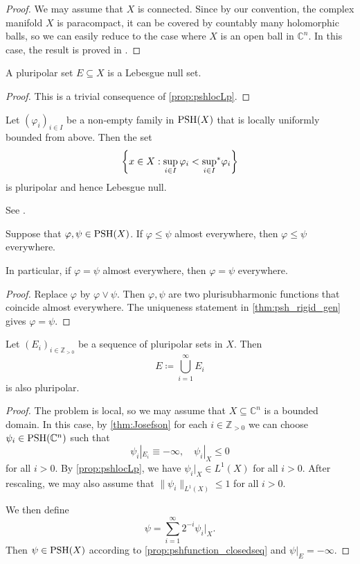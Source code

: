 \begin{proof}
    We may assume that $X$ is connected. Since by our convention, the complex manifold $X$ is paracompact, it can be covered by countably many holomorphic balls, so we can easily reduce to the case where $X$ is an open ball in $\mathbb{C}^n$. In this case, the result is proved in \cite[Lemma~4.31]{GZ17}.
\end{proof}



\begin{proposition}\label{prop:ppsnull}
    A pluripolar set $E\subseteq X$ is a Lebesgue null set.
\end{proposition}
\begin{proof}
    This is a trivial consequence of \cref{prop:pshlocLp}.
\end{proof}

\begin{proposition}\label{prop:supsupstardiff}
    Let $(\varphi_i)_{i\in I}$ be a non-empty family in $\PSH(X)$ that is locally uniformly bounded from above. Then the set
    \[
        \left\{x\in X: \sup_{i\in I}\varphi_i<\uscsup[i\in I]\varphi_i \right\}
    \]
    is pluripolar and hence Lebesgue null.
\end{proposition}
See \cite[Corollary~4.28]{GZ17}.




\begin{proposition}\label{prop:pshfuncdetdense}
    Suppose that $\varphi,\psi\in \PSH(X)$. If $\varphi\leq \psi$ almost everywhere, then $\varphi\leq \psi$ everywhere.

    In particular, if $\varphi=\psi$ almost everywhere, then $\varphi=\psi$ everywhere.
\end{proposition}
\begin{proof}
    Replace $\varphi$ by $\varphi\lor\psi$. Then $\varphi,\psi$ are two plurisubharmonic functions that coincide almost everywhere. The uniqueness statement in \cref{thm:psh_rigid_gen} gives $\varphi=\psi$.
\end{proof}


\begin{proposition}\label{prop:pluripolarunion}
    Let $(E_i)_{i\in \mathbb{Z}_{>0}}$ be a sequence of pluripolar sets in $X$. Then
    \[
    E\coloneqq \bigcup_{i=1}^{\infty}E_i
    \]
    is also pluripolar.
\end{proposition}
\begin{proof}
    The problem is local, so we may assume that $X\subseteq \mathbb{C}^n$ is a bounded domain. In this case, by \cref{thm:Josefson} for each $i\in \mathbb{Z}_{>0}$ we can choose $\psi_i\in \PSH(\mathbb{C}^n)$ such that
    \[
    \psi_i|_{E_i}\equiv -\infty,\quad \psi_i|_X\leq 0
    \]
    for all $i>0$. By \cref{prop:pshlocLp}, we have $\psi_i|_X\in L^1(X)$ for all $i>0$. After rescaling, we may also assume that $\|\psi_i\|_{L^1(X)}\leq 1$ for all $i>0$.

    We then define
    \[
    \psi=\sum_{i=1}^{\infty}2^{-i} \psi_i|_X.
    \]
    Then $\psi\in \PSH(X)$ according to \cref{prop:pshfunction_closedseq} and $\psi|_{E}=-\infty$.
\end{proof}



